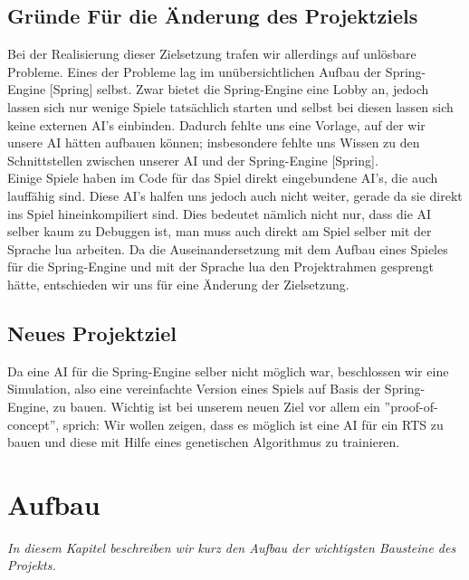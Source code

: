 \documentclass[
	12pt,
	a4paper,
	BCOR10mm,
	DIV14,
	headsepline,
	usegeometry,
]{scrreprt}
\begin{document}
\section{Gründe Für die Änderung des Projektziels}
Bei der Realisierung dieser Zielsetzung trafen wir allerdings auf unlösbare Probleme. Eines der Probleme lag im unübersichtlichen Aufbau der Spring-Engine [Spring] selbst. Zwar bietet die Spring-Engine eine Lobby an, jedoch lassen sich nur wenige Spiele tatsächlich starten und selbst bei diesen lassen sich keine externen AI's einbinden. Dadurch fehlte uns eine Vorlage, auf der wir unsere AI hätten aufbauen können; insbesondere fehlte uns Wissen zu den Schnittstellen zwischen unserer AI und der Spring-Engine [Spring]. \\
Einige Spiele haben im Code für das Spiel direkt eingebundene AI's, die auch lauffähig sind. Diese AI's halfen uns jedoch auch nicht weiter, gerade da sie direkt ins Spiel hineinkompiliert sind. Dies bedeutet nämlich nicht nur, dass die AI selber kaum zu Debuggen ist, man muss auch direkt am Spiel selber mit der Sprache lua arbeiten. Da die Auseinandersetzung mit dem Aufbau eines Spieles für die Spring-Engine und mit der Sprache lua den Projektrahmen gesprengt hätte, entschieden wir uns für eine Änderung der Zielsetzung.

\section{Neues Projektziel}
Da eine AI für die Spring-Engine selber nicht möglich war, beschlossen wir eine Simulation, also eine vereinfachte Version eines Spiels auf Basis der Spring-Engine, zu bauen. Wichtig ist bei unserem neuen Ziel vor allem ein ''proof-of-concept'', sprich: Wir wollen zeigen, dass es möglich ist eine AI für ein RTS zu bauen und diese mit Hilfe eines genetischen Algorithmus zu trainieren.


\chapter{Aufbau}
\label{Aufbau}

\textit{%
In diesem Kapitel beschreiben wir kurz den Aufbau der wichtigsten Bausteine des Projekts.
}

\bigskip
\end{document}
